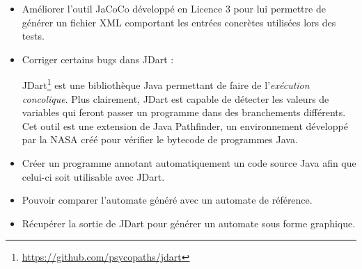 \begin{itemize}
\item Améliorer l'outil JaCoCo développé en Licence 3 pour lui
  permettre de générer un fichier XML comportant les entrées concrètes
  utilisées lors des tests.
\item Corriger certains bugs dans JDart :
			
			JDart\footnote{\url{https://github.com/psycopaths/jdart}} est une
			bibliothèque Java permettant de faire de l'\textit{exécution
			concolique}. Plus clairement, JDart est capable de détecter les
			valeurs de variables qui feront passer un programme dans des
			branchements différents. Cet outil est une extension de Java
			Pathfinder, un environnement développé par la NASA créé pour vérifier
			le bytecode de programmes Java.
\item Créer un programme annotant automatiquement un code source Java
  afin que celui-ci soit utilisable avec JDart.
\item Pouvoir comparer l'automate généré avec un automate de
  référence.
\item Récupérer la sortie de JDart pour générer un automate sous forme
  graphique.
\end{itemize}